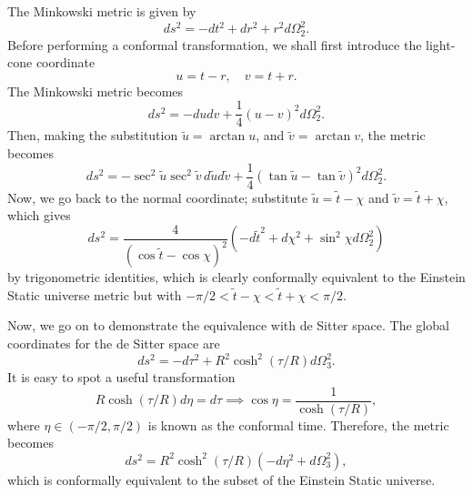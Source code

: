 \begin{solution}
    The Minkowski metric is given by
    \begin{equation}
        ds^2 = -dt^2 +dr^2 + r^2 d\Omega_2^2.
    \end{equation}
    Before performing a conformal transformation, we shall first introduce the light-cone coordinate
    \begin{equation}
        u=t-r,  \quad v = t+r.
    \end{equation}
    The Minkowski metric becomes
    \begin{equation}
        ds^2 = -dudv+\frac{1}{4}(u-v)^2d\Omega_2^2.
    \end{equation}
    Then, making the substitution $\tilde{u}=\arctan u$, and $\tilde{v} = \arctan v$, the metric becomes
    \begin{equation}
        ds^2 = -\sec^2\tilde{u}\sec^2\tilde{v}\,d\tilde{u}d\tilde{v} + \frac{1}{4}(\tan\tilde{u}-\tan\tilde{v})^2d\Omega_2^2.
    \end{equation}
    Now, we go back to the normal coordinate; substitute $\tilde{u}=\tilde{t}-\chi$ and $\tilde{v}=\tilde{t} + \chi$, which gives
    \begin{equation}
        ds^2 = \frac{4}{(\cos\tilde{t}-\cos\chi)^2}\left(-d\tilde{t}^2 + d\chi^2 +\sin^2\chi d\Omega_2^2\right)
    \end{equation}
    by trigonometric identities, which is clearly conformally equivalent to the Einstein Static universe metric but with $-\pi/2<\tilde{t}-\chi<\tilde{t}+\chi <\pi/2 $.

    Now, we go on to demonstrate the equivalence with de Sitter space. The global coordinates for the de Sitter space are
    \begin{equation}
        ds^2 = - d\tau^2 + R^2\cosh^2(\tau/R)d\Omega_3^2.
    \end{equation}
    It is easy to spot a useful transformation
    \begin{equation}
        R\cosh(\tau/R)d\eta =  d\tau\implies \cos\eta = \frac{1}{\cosh(\tau/R)},
    \end{equation}
    where $\eta\in(-\pi/2,\pi/2)$ is known as the conformal time. Therefore, the metric becomes
    \begin{equation}
        ds^2 = R^2\cosh^2(\tau/R)(-d\eta^2+d\Omega_3^2), 
    \end{equation}
    which is conformally equivalent to the subset of the Einstein Static universe.


\end{solution}
